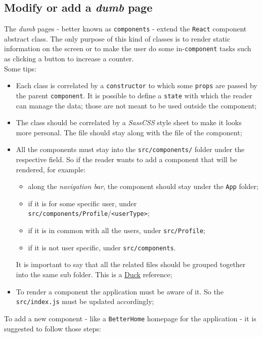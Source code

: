 \subsection{Modify or add a \emph{dumb} page}
The \emph{dumb} pages - better known as \verb|components| - extend the \verb|React| component abstract class. The only purpose of this kind of classes is to render static information on the screen or to make the user do some in-\verb|component| tasks such as clicking a button to increase a counter.
\\Some tips: 
\begin{itemize}
	\item Each class is correlated by a \verb|constructor| to which some \verb|props| are passed by the parent \verb|component|. It is possible to define a \verb|state| with which the reader can manage the data; those are not meant to be used outside the component;
	\item The class should be correlated by a \emph{SassCSS} style sheet to make it looks more personal. The file should stay along with the file of the component;
	\item All the components must stay into the \verb|src/components/| folder under the respective field. So if the reader wants to add a component that will be rendered, for example:
	\begin{itemize}
		\item along the \emph{navigation bar}, the component should stay under the \verb|App| folder;
		\item if it is for some specific user, under \verb|src/components/Profile|/\verb|<userType>|;
		\item if it is in common with all the users, under \verb|src/Profile|;
		\item if it is not user specific, under \verb|src/components|.
	\end{itemize}  
	It is important to say that all the related files should be grouped together into the same sub folder. This is a \href{https://medium.freecodecamp.org/scaling-your-redux-app-with-ducks-6115955638be}{Duck} reference;
	\item To render a component the application must be aware of it. So the \verb|src/index.js| must be updated accordingly;
	
\end{itemize}
To add a new component - like a \verb|BetterHome| homepage for the application - it is suggested to follow those steps:
